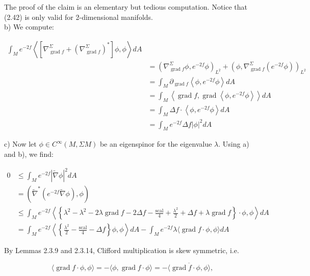 \documentclass[10pt, letterpaper]{article}
\begin{document}
The proof of the claim is an elementary but tedious computation. Notice that (2.42) is only valid for 2-dimensional manifolds.\\
b) We compute:

$$
\begin{aligned}
\int_{M} e^{-2 f}\left\langle\left[\nabla_{\operatorname{grad} f}^{\Sigma}+\left(\nabla_{\operatorname{grad} f}^{\Sigma}\right)^{*}\right] \phi, \phi\right\rangle d A & \\
& =\left(\nabla_{\operatorname{grad} f}^{\Sigma} \phi, e^{-2 f} \phi\right)_{L^{2}}+\left(\phi, \nabla_{\operatorname{grad} f}^{\Sigma}\left(e^{-2 f} \phi\right)\right)_{L^{2}} \\
& =\int_{M} \partial_{\operatorname{grad} f}\left\langle\phi, e^{-2 f} \phi\right\rangle d A \\
& =\int_{M}\left\langle\operatorname{grad} f, \operatorname{grad}\left\langle\phi, e^{-2 f} \phi\right\rangle\right\rangle d A \\
& =\int_{M} \Delta f \cdot\left\langle\phi, e^{-2 f} \phi\right\rangle d A \\
& =\int_{M} e^{-2 f} \Delta f|\phi|^{2} d A
\end{aligned}
$$

c) Now let $\phi \in C^{\infty}(M, \Sigma M)$ be an eigenspinor for the eigenvalue $\lambda$. Using a) and b), we find:

$$
\begin{aligned}
0 & \leq \int_{M} e^{-2 f}|\widetilde{\nabla} \phi|^{2} d A \\
& =\left(\widetilde{\nabla}^{*}\left(e^{-2 f} \tilde{\nabla} \phi\right), \phi\right) \\
& \leq \int_{M} e^{-2 f}\left\langle\left\{\lambda^{2}-\lambda^{2}-2 \lambda \operatorname{grad} f-2 \Delta f-\frac{\mathrm{scal}}{4}+\frac{\lambda^{2}}{2}+\Delta f+\lambda \operatorname{grad} f\right\} \cdot \phi, \phi\right\rangle d A \\
& =\int_{M} e^{-2 f}\left\langle\left\{\frac{\lambda^{2}}{2}-\frac{\mathrm{scal}}{4}-\Delta f\right\} \phi, \phi\right\rangle d A-\int_{M} e^{-2 f} \lambda\langle\operatorname{grad} f \cdot \phi, \phi\rangle d A
\end{aligned}
$$

By Lemmas 2.3.9 and 2.3.14, Clifford multiplication is skew symmetric, i.e.

$$
\langle\operatorname{grad} f \cdot \phi, \phi\rangle=-\langle\phi, \operatorname{grad} f \cdot \phi\rangle=-\overline{\langle\operatorname{grad} f \cdot \phi, \phi\rangle},
$$
\end{document}
